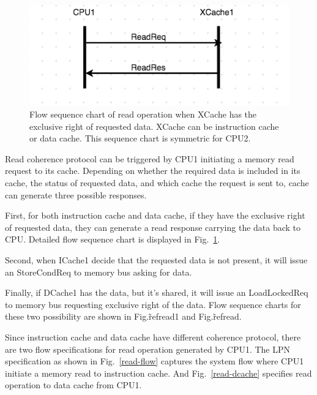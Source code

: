 \documentclass[conference]{IEEEtran}
\begin{document}
 \begin{figure} 
 \includegraphics[width=2In]{figures/read1.png}
 \caption{Flow sequence chart of read operation when XCache has the exclusive right of requested data. XCache can be instruction cache or data cache. This sequence chart is symmetric for CPU2. }
 \label{read1}
 \end{figure}

 
Read coherence protocol can be triggered by CPU1 initiating a memory read request to its cache. Depending on whether the required data is included in its cache, the status of requested data,  and which cache the request is sent to, cache can generate three possible responses. 

First, for both instruction cache and data cache, if they have the exclusive right of requested data, they can generate a read response carrying the data back to CPU. Detailed flow sequence chart is displayed in Fig.~\ref{read1}.

Second, when ICache1 decide that the requested data is not present, it will issue an StoreCondReq to memory bus asking for data. 

Finally, if DCache1 has the data, but it's shared, it will issue an LoadLockedReq to memory bus requesting exclusive right of the data. Flow sequence charts for these two possibility are shown in Fig.\~ref{read1} and Fig.\~ref{read}.
 
Since instruction cache and data cache have different coherence protocol, there are two flow specifications for read operation generated by CPU1. The LPN specification as shown in Fig.~\ref{read-flow} captures the system flow where CPU1 initiate a memory read to instruction cache. And Fig.~\ref{read-dcache} specifies read operation to data cache from CPU1.
\end{document}
